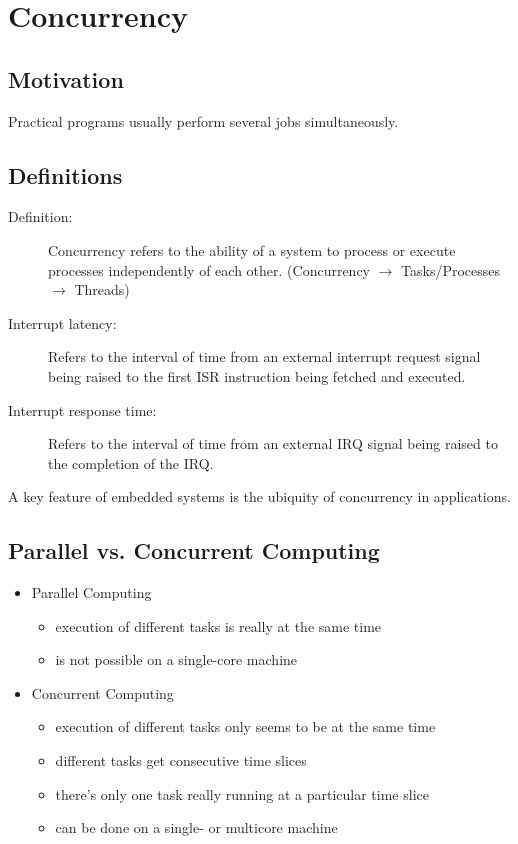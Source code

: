 \section{Concurrency}

\subsection{Motivation}
Practical programs usually perform several jobs \glqq simultaneously\grqq.

\subsection{Definitions}
\begin{description}
  \item[Definition:] Concurrency refers to the ability of a system to process or execute processes independently of each other.
        (Concurrency $\rightarrow$ Tasks/Processes $\rightarrow$ Threads)
  \item [Interrupt latency:] Refers to the interval of time from an external interrupt request signal being raised to the first ISR instruction being fetched and executed.
  \item [Interrupt response time:] Refers to the interval of time from an external IRQ signal being raised to the completion of the IRQ.
\end{description}
A key feature of embedded systems is the ubiquity of concurrency in applications.

\subsection{Parallel vs. Concurrent Computing}
\begin{itemize}
  \item Parallel Computing
        \begin{itemize}
          \item execution of different tasks is really at the same time
          \item is not possible on a single-core machine
        \end{itemize}
  \item Concurrent Computing
        \begin{itemize}
          \item execution of different tasks only seems to be at the same time
          \item different tasks get consecutive time slices
          \item there's only one task really running at a particular time slice
          \item can be done on a single- or multicore machine
        \end{itemize}
\end{itemize}

